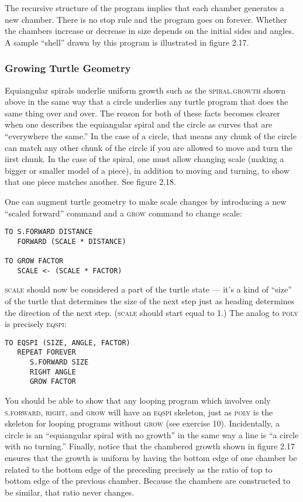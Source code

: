 \documentclass{book}
\begin{document}
The recursive structure of the program implies that each chamber generates
a new chamber. There is no stop rule and the program goes on forever.
Whether the chambers increase or decrease in size depends on the initial
sides and angles. A sample ``shell'' drawn by this program is illustrated in
figure 2.17.

\subsubsection{Growing Turtle Geometry}

Equiangular spirals underlie uniform growth such as the \textsc{spiral.growth}
shown above in the same way that a circle underlies any turtle program
that does the same thing over and over. The reason for both of these
facts becomes clearer when one describes the equiangular spiral and the
circle as curves that are ``everywhere the same.'' In the case of a circle,
that means any chunk of the circle can match any other chunk of the
circle if you are allowed to move and turn the iirst chunk. In the case
of the spiral, one must allow changing scale (making a bigger or smaller
model of a piece), in addition to moving and turning, to show that one
piece matches another. See figure 2.18.

One can augment turtle geometry to make scale changes by introducing a new ``scaled forward'' command and a \textsc{grow} command to change
scale:

\begin{verbatim}
TO S.FORWARD DISTANCE
   FORWARD (SCALE * DISTANCE)
 
TO GROW FACTOR
   SCALE <- (SCALE * FACTOR)
\end{verbatim}
\noindent \textsc{scale} should now be considered a part of the turtle state --- it's a kind
of ``size'' of the turtle that determines the size of the next step just as
heading determines the direction of the next step. (\textsc{scale} should start
equal to 1.)
The analog to \textsc{poly} is precisely \textsc{eqspi}:

\begin{verbatim}
TO EQSPI (SIZE, ANGLE, FACTOR)
   REPEAT FOREVER
      S.FORWARD SIZE
      RIGHT ANGLE
      GROW FACTOR
\end{verbatim}
You should be able to show that any looping program which involves
only \textsc{s.forward}, \textsc{right}, and \textsc{grow} will have an \textsc{eqspi} skeleton, just as
\textsc{poly} is the skeleton for looping programs without \textsc{grow} (see exercise
10). Incidentally, a circle is an ``equiangular spiral with no growth'' in
the same way a line is ``a circle with no turning.'' Finally, notice that
the chambered growth shown in figure 2.17 ensures that the growth is
uniform by having the bottom edge of one chamber be related to the
bottom edge of the preceding precisely as the ratio of top to bottom
edge of the previous chamber. Because the chambers are constructed to
be similar, that ratio never changes.
\end{document}
